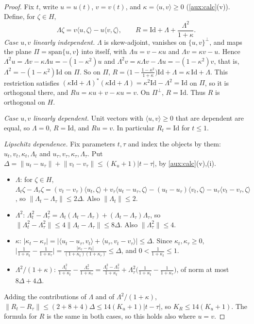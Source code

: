 \documentclass[11pt]{article}
\newcommand{\norm}[1]{\lVert #1\rVert}
\newcommand{\ip}[2]{\langle #1,#2\rangle}
\theoremstyle{definition}
\numberwithin{equation}{section}
\begin{document}
\begin{proof}
Fix \(t\), write \(u=u(t)\), \(v=v(t)\), and
\(\kappa=\ip uv\ge0\) (\cref{aux:calc}(v)). Define, for \(\zeta\in H\),
\[
 \Lambda\zeta=v\ip{u}{\zeta}-u\ip{v}{\zeta},
 \qquad R=\mathrm{Id}+\Lambda+\frac{\Lambda^2}{1+\kappa}.
\]
\emph{Case \(u,v\) linearly independent.} \(\Lambda\) is skew-adjoint,
vanishes on \(\{u,v\}^\perp\), and maps the plane \(\Pi=\mathrm{span}\{u,v\}\)
into itself, with \(\Lambda u=v-\kappa u\) and \(\Lambda v=\kappa v-u\). Hence
\(\Lambda^2u=\Lambda v-\kappa\Lambda u=-(1-\kappa^2)u\) and
\(\Lambda^2v=\kappa\Lambda v-\Lambda u=-(1-\kappa^2)v\), that is,
\(\Lambda^2=-(1-\kappa^2)\mathrm{Id}\) on \(\Pi\). So on \(\Pi\),
\(R=\bigl(1-\frac{1-\kappa^2}{1+\kappa}\bigr)\mathrm{Id}+\Lambda
=\kappa\,\mathrm{Id}+\Lambda\). This restriction satisfies
\((\kappa\mathrm{Id}+\Lambda)^*(\kappa\mathrm{Id}+\Lambda)
=\kappa^2\mathrm{Id}-\Lambda^2=\mathrm{Id}\) on \(\Pi\), so it is orthogonal
there, and \(Ru=\kappa u+v-\kappa u=v\). On \(\Pi^\perp\), \(R=\mathrm{Id}\).
Thus \(R\) is orthogonal on \(H\).

\emph{Case \(u,v\) linearly dependent.} Unit vectors with \(\ip uv\ge0\) that
are dependent are equal, so \(\Lambda=0\), \(R=\mathrm{Id}\), and \(Ru=v\). In
particular \(R_t=\mathrm{Id}\) for \(t\le1\).

\emph{Lipschitz dependence.} Fix parameters \(t,\tau\) and index the objects
by them: \(u_t,v_t,\kappa_t,\Lambda_t\) and
\(u_\tau,v_\tau,\kappa_\tau,\Lambda_\tau\). Put
\(\Delta=\norm{u_t-u_\tau}+\norm{v_t-v_\tau}\le(K_u+1)|t-\tau|\), by
\cref{aux:calc}(v),(i).
\begin{itemize}
\item \(\Lambda\): for \(\zeta\in H\),
\(\Lambda_t\zeta-\Lambda_\tau\zeta
=(v_t-v_\tau)\ip{u_t}{\zeta}+v_\tau\ip{u_t-u_\tau}{\zeta}
-(u_t-u_\tau)\ip{v_t}{\zeta}-u_\tau\ip{v_t-v_\tau}{\zeta}\), so
\(\norm{\Lambda_t-\Lambda_\tau}\le2\Delta\). Also \(\norm{\Lambda_t}\le2\).
\item \(\Lambda^2\):
\(\Lambda_t^2-\Lambda_\tau^2
=\Lambda_t(\Lambda_t-\Lambda_\tau)+(\Lambda_t-\Lambda_\tau)\Lambda_\tau\), so
\(\norm{\Lambda_t^2-\Lambda_\tau^2}\le4\norm{\Lambda_t-\Lambda_\tau}\le8\Delta\).
Also \(\norm{\Lambda_\tau^2}\le4\).
\item \(\kappa\):
\(|\kappa_t-\kappa_\tau|
=|\ip{u_t-u_\tau}{v_t}+\ip{u_\tau}{v_t-v_\tau}|\le\Delta\). Since
\(\kappa_t,\kappa_\tau\ge0\),
\(\bigl|\frac1{1+\kappa_t}-\frac1{1+\kappa_\tau}\bigr|
=\frac{|\kappa_\tau-\kappa_t|}{(1+\kappa_t)(1+\kappa_\tau)}\le\Delta\), and
\(0<\frac1{1+\kappa_t}\le1\).
\item \(\Lambda^2/(1+\kappa)\):
\(\frac{\Lambda_t^2}{1+\kappa_t}-\frac{\Lambda_\tau^2}{1+\kappa_\tau}
=\frac{\Lambda_t^2-\Lambda_\tau^2}{1+\kappa_t}
+\Lambda_\tau^2\bigl(\frac1{1+\kappa_t}-\frac1{1+\kappa_\tau}\bigr)\), of
norm at most \(8\Delta+4\Delta\).
\end{itemize}
Adding the contributions of \(\Lambda\) and of \(\Lambda^2/(1+\kappa)\),
\(\norm{R_t-R_\tau}\le(2+8+4)\Delta\le14(K_u+1)|t-\tau|\), so
\(K_R\le14(K_u+1)\). The formula for \(R\) is the same in both cases, so this
holds also where \(u=v\).
\end{proof}
\end{document}
